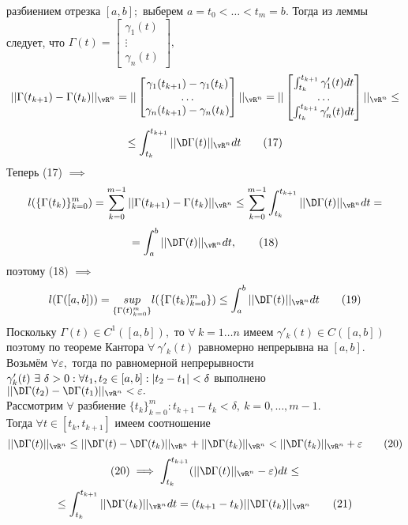 \documentclass[main]{subfiles}
\begin{document}
\begin{longProof}
    разбиением отрезка $[a,b];$ выберем $a=t_0<\dots<t_m=b.$ Тогда из леммы следует, что
    \( \Gamma(t)=\begin{bmatrix}\gamma_1(t)\\\vdots\\\gamma_n(t) \end{bmatrix}, \)
    \[ || \Gamma(t_{k+1})-\Gamma(t_k)||_{\vR^n}=||\begin{bmatrix}\gamma_1(t_{k+1})-\gamma_1(t_k) \\\dots\\\gamma_n(t_{k+1})-
            \gamma_n(t_k)\end{bmatrix}||_{\vR^n}=||\begin{bmatrix}\int_{t_{k}}^{t_{k+1}}\gamma_1'(t)dt \\\dots\\
            \int_{t_{k}}^{t_{k+1}}\gamma_n'(t)dt\end{bmatrix}||_{\vR^n}\leq\]\[\leq \int_{t_k}^{t_{k+1}}||\D \Gamma(t)||_{\vR^n} dt\tag{17} \]
    Теперь (17) $\implies$ \[ l(\{ \Gamma(t_k)\}_{k=0}^m)=\sum_{k=0}^{m-1}||\Gamma(t_{k+1})-\Gamma(t_k)||_{\vR^n}\leq \sum\limits_{k=0}^{m-1}\int_{t_k}^{t_{k+1}}||\D\Gamma(t)||_{\vR^n} dt=\]\[=\int_a^b||\D\Gamma(t)||_{\vR^n} dt,\tag{18} \]
    поэтому (18) $\implies$
    \[ l(\Gamma([a,b]))=\underset{\{\Gamma(t)_{k=0}^m\}}{sup} l(\{\Gamma(t_k)_{k=0}^m\})\leq \int_a^b||\D\Gamma(t)||_{\vR^n} dt\tag{19} \]
    Поскольку $\Gamma(t)\in C^1([a,b]),$ то $\forall\ k=1\dots n$ имеем $\gamma'_k(t)\in C([a,b])$ поэтому по теореме Кантора $\forall\ \gamma'_k(t)$ равномерно непрерывна на $[a,b].$\\ Возьмём $\forall\varepsilon,$ тогда по равномерной непрерывности $\gamma_k'(t)\ \exists\ \delta>0:\\ \forall t_1, t_2\in[a,b]: |t_2-t_1|<\delta$ выполнено $||\D\Gamma(t_2)-\D\Gamma(t_1)||_{\vR^n}<\varepsilon.$\\
    Рассмотрим $\forall$ разбиение $\{ t_k\}^m_{k=0}: t_{k+1}-t_k<\delta,\ k=0,\dots,m-1.$\\
    Тогда $\forall t\in [t_k,t_{k+1}]$ имеем соотношение
    \[ ||\D\Gamma(t)||_{\vR^n}\leq||\D\Gamma(t)-\D\Gamma(t_k)||_{\vR^n}+||\D\Gamma(t_k)||_{\vR^n}<||\D\Gamma(t_k)||_{\vR^n}+\varepsilon\tag{20} \]
    \begin{multline*}
        (20)\implies \int_{t_k}^{t_{k+1}}(||\D\Gamma(t)||_{\vR^n}-\varepsilon)dt\leq \\
        \leq \int_{t_k}^{t_{k+1}}||\D\Gamma(t_k)||_{\vR^n} dt=(t_{k+1}-t_k)||\D\Gamma(t_k)||_{\vR^n}\tag{21}
    \end{multline*}

\end{longProof}
\end{document}
